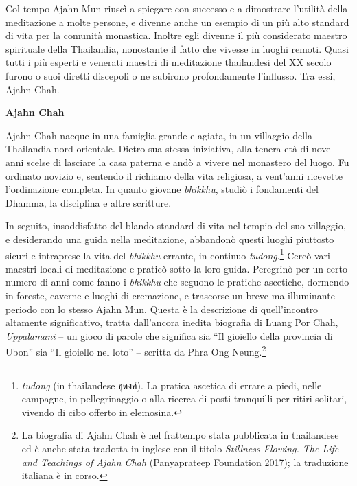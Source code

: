 Col tempo Ajahn Mun riuscì a spiegare con successo e a dimostrare
l'utilità della meditazione a molte persone, e divenne anche un esempio
di un più alto standard di vita per la comunità monastica. Inoltre egli
divenne il più considerato maestro spirituale della Thailandia,
nonostante il fatto che vivesse in luoghi remoti. Quasi tutti i più
esperti e venerati maestri di meditazione thailandesi del XX secolo
furono o suoi diretti discepoli o ne subirono profondamente l'influsso.
Tra essi, Ajahn Chah.

\textbf{Ajahn Chah}

Ajahn Chah nacque in una famiglia grande e agiata, in un villaggio della
Thailandia nord-orientale. Dietro sua stessa iniziativa, alla tenera età
di nove anni scelse di lasciare la casa paterna e andò a vivere nel
monastero del luogo. Fu ordinato novizio e, sentendo il richiamo della
vita religiosa, a vent'anni ricevette l'ordinazione completa. In quanto
giovane \emph{bhikkhu}, studiò i fondamenti del Dhamma, la disciplina e
altre scritture.

In seguito, insoddisfatto del blando standard di vita nel tempio del suo
villaggio, e desiderando una guida nella meditazione, abbandonò questi
luoghi piuttosto sicuri e intraprese la vita del \emph{bhikkhu} errante,
in continuo \emph{tudong}.\footnote{\emph{tudong} (in thailandese
  ธุดงค์). La pratica ascetica di errare a piedi, nelle campagne, in
  pellegrinaggio o alla ricerca di posti tranquilli per ritiri solitari,
  vivendo di cibo offerto in elemosina.} Cercò vari maestri locali di
meditazione e praticò sotto la loro guida. Peregrinò per un certo numero
di anni come fanno i \emph{bhikkhu} che seguono le pratiche ascetiche,
dormendo in foreste, caverne e luoghi di cremazione, e trascorse un
breve ma illuminante periodo con lo stesso Ajahn Mun. Questa è la
descrizione di quell'incontro altamente significativo, tratta
dall'ancora inedita biografia di Luang Por Chah, \emph{Uppalamani} -- un
gioco di parole che significa sia ``Il gioiello della provincia di
Ubon'' sia ``Il gioiello nel loto'' -- scritta da Phra Ong
Neung.\footnote{La biografia di Ajahn Chah è nel frattempo stata
  pubblicata in thailandese ed è anche stata tradotta in inglese con il
  titolo \emph{Stillness Flowing. The Life and Teachings of Ajahn Chah}
  (Panyaprateep Foundation 2017); la traduzione italiana è in corso.}

